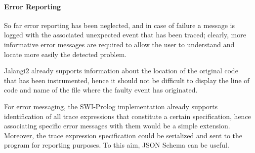 
\paragraph{Error Reporting}
So far error reporting has been neglected, and in case of failure a message is logged with the associated
unexpected event that has been traced; clearly, more informative error messages
are required to allow the user to understand and locate more easily the detected problem.

Jalangi2 already supports information about the location of the original code that has been
instrumented, hence it should not be difficult to display the line of code and name of the file where
the faulty event has originated.

For error messaging, the SWI-Prolog implementation already supports identification of
all trace expressions that constitute a certain specification, hence associating specific error messages with them
would be a simple extension.
Moreover, the trace expression specification could be serialized and sent to the program for reporting purposes.
To this aim, JSON Schema \cite{jsonschema} can be useful.


